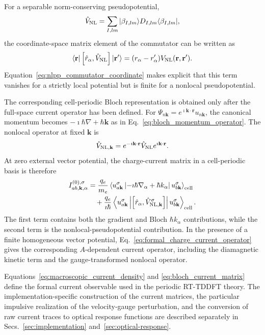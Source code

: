 For a separable norm-conserving pseudopotential,\cite{KleinmanBylander}
\begin{equation}
  \hat V_{\rm NL}
  =
  \sum_{I,lm}
  |\beta_{I,lm}\rangle
  D_{I,lm}
  \langle\beta_{I,lm}|,
  \label{eq:separable_nlpp}
\end{equation}
the coordinate-space matrix element of the commutator can be written as
\begin{equation}
  \langle\mathbf r|
  \left[
    \hat r_\alpha,\hat V_{\rm NL}
  \right]
  |\mathbf r'\rangle
  =
  (r_\alpha-r'_\alpha)
  V_{\rm NL}(\mathbf r,\mathbf r').
  \label{eq:nlpp_commutator_coordinate}
\end{equation}
Equation~\eqref{eq:nlpp_commutator_coordinate} makes explicit that this
term vanishes for a strictly local potential but is finite for a
nonlocal pseudopotential.

The corresponding cell-periodic Bloch representation is obtained only
after the full-space current operator has been defined.  For
$\Psi_{n\mathbf k}=e^{\imath\mathbf k\cdot\mathbf r}
u_{n\mathbf k}$, the canonical momentum becomes
$-\imath\hbar\nabla+\hbar\mathbf k$ as in
Eq.~\eqref{eq:bloch_momentum_operator}.  The nonlocal operator at fixed
$\mathbf k$ is
\begin{equation}
  \hat V_{{\rm NL},\mathbf k}
  =
  e^{-\imath\mathbf k\cdot\mathbf r}
  \hat V_{\rm NL}
  e^{\imath\mathbf k\cdot\mathbf r}.
  \label{eq:nlpp_bloch_transform}
\end{equation}
At zero external vector potential, the charge-current matrix in a
cell-periodic basis is therefore
\begin{align}
  I_{ab,\mathbf k,\alpha}^{(0),\sigma}
  &=
  \frac{q_e}{m_e}
  \left\langle
    u_{a\mathbf k}^{\sigma}
    \left|
    -\imath\hbar\nabla_\alpha+\hbar k_\alpha
    \right|
    u_{b\mathbf k}^{\sigma}
  \right\rangle_{\rm cell}
  \nonumber\\
  &\quad
  +
  \frac{q_e}{\imath\hbar}
  \left\langle
    u_{a\mathbf k}^{\sigma}
    \left|
    \left[
      \hat r_\alpha,\hat V_{{\rm NL},\mathbf k}^{\sigma}
    \right]
    \right|
    u_{b\mathbf k}^{\sigma}
  \right\rangle_{\rm cell}.
  \label{eq:bloch_current_matrix}
\end{align}
The first term contains both the gradient and Bloch
$\hbar k_\alpha$ contributions, while the second term is the
nonlocal-pseudopotential contribution.  In the presence of a finite
homogeneous vector potential, Eq.~\eqref{eq:formal_charge_current_operator}
gives the corresponding $A$-dependent current operator, including the
diamagnetic kinetic term and the gauge-transformed nonlocal operator.

Equations~\eqref{eq:macroscopic_current_density} and
\eqref{eq:bloch_current_matrix} define the formal current observable used
in the periodic RT-TDDFT theory.  The implementation-specific
construction of the current matrices, the particular impulsive
realization of the velocity-gauge perturbation, and the conversion of raw
current traces to optical response functions are described separately in
Secs.~\ref{sec:implementation} and~\ref{sec:optical-response}.
